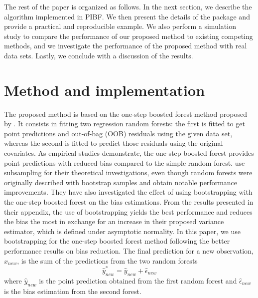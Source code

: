 The rest of the paper is organized as follows. In the next section, we describe the algorithm implemented in PIBF. We then present the details of the package and provide a practical and reproducible example. We also perform a simulation study to compare the performance of our proposed method to existing competing methods, and we investigate the performance of the proposed method with real data sets. Lastly, we conclude with a discussion of the results.

\section{Method and implementation}

The proposed method is based on the one-step boosted forest method proposed by \citet{ghosal_boosting_2021}. It consists in fitting two regression random forests: the first is fitted to get point predictions and out-of-bag (OOB) residuals using the given data set, whereas the second is fitted to predict those residuals using the original covariates. As empirical studies demonstrate, the one-step boosted forest provides point predictions with reduced bias compared to the simple random forest. \citet{ghosal_boosting_2021} use subsampling for their theoretical investigations, even though random forests were originally described with bootstrap samples and obtain notable performance improvements. They have also investigated the effect of using bootstrapping with the one-step boosted forest on the bias estimations. From the results presented in their appendix, the use of bootstrapping yields the best performance and reduces the bias the most in exchange for an increase in their proposed variance estimator, which is defined under asymptotic normality. In this paper, we use bootstrapping for the one-step boosted forest method following the better performance results on bias reduction. The final prediction for a new observation, $x_{new}$, is the sum of the predictions from the two random forests
\begin{equation}
    \hat y^{*}_{new} = \hat y^{}_{new} + \hat \epsilon^{}_{new}
\end{equation}
where $\hat y^{}_{new}$ is the point prediction obtained from the first random forest and $\hat \epsilon^{}_{new}$ is the bias estimation from the second forest.

